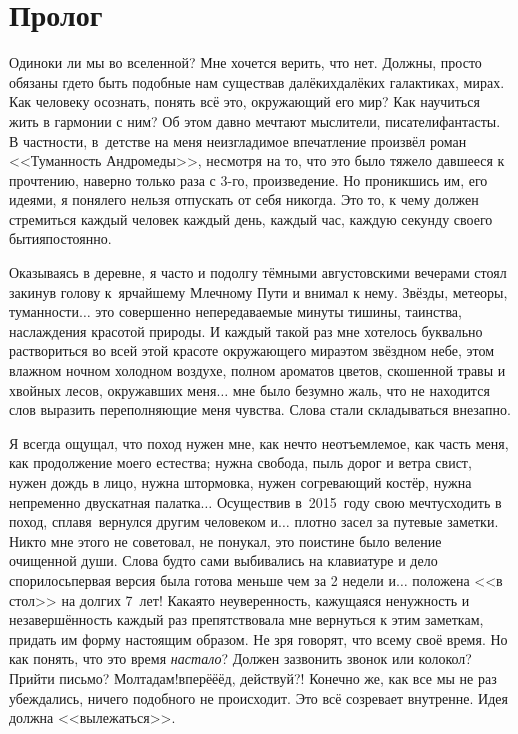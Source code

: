 \newpage
{
\thispagestyle{empty}
\section*{Пролог}

Одиноки ли мы во вселенной? Мне хочется верить, что нет. Должны, просто обязаны где\sdash то быть подобные нам существа\mdash в далёких\sdash далёких галактиках, мирах. Как человеку осознать, понять всё это, окружающий его мир? Как научиться жить в гармонии с ним? Об этом давно мечтают мыслители, писатели\sdash фантасты. В частности, в~детстве на меня неизгладимое впечатление произвёл роман <<Туманность Андромеды>>\cite{ТуманностьАндромеды}, несмотря на то, что это было тяжело давшееся к прочтению, наверно только раза с 3-го, произведение. Но проникшись им, его идеями, я понял\mdash его нельзя отпускать от себя ни\sdash ко\sdash гда. Это то, к чему должен стремиться каждый человек каждый день, каждый час, каждую секунду своего бытия\mdash постоянно. 

Оказываясь в деревне, я часто и подолгу тёмными августовскими вечерами стоял закинув голову к~ярчайшему Млечному Пути и внимал к нему. Звёзды, метеоры, туманности$\ldots$ это совершенно непередаваемые минуты тишины, таинства, наслаждения красотой природы. И каждый такой раз мне хотелось буквально раствориться во всей этой красоте окружающего мира\mdash этом звёздном небе, этом влажном ночном холодном воздухе, полном ароматов цветов, скошенной травы и хвойных лесов, окружавших меня$\ldots$ мне было безумно жаль, что не находится слов выразить переполняющие меня чувства. Слова стали складываться внезапно. 

Я всегда ощущал, что поход нужен мне, как нечто неотъемлемое, как часть меня, как продолжение моего естества; нужна свобода, пыль дорог и ветра свист, нужен дождь в лицо, нужна штормовка, нужен согревающий костёр, нужна непременно двускатная палатка$\ldots$ Осуществив в~2015~году свою мечту\mdash сходить в поход, сплав\mdash я~вернулся другим человеком и$\ldots$ плотно засел за путевые заметки. Никто мне этого не советовал, не понукал, это поистине было веление очищенной души. Слова будто сами выбивались на клавиатуре и дело спорилось\mdash первая версия была готова меньше чем за 2 недели и$\ldots$ положена <<в стол>> на долгих 7~лет! Какая\sdash то неуверенность, кажущаяся ненужность и незавершённость каждый раз препятствовала мне вернуться к этим заметкам, придать им форму настоящим образом. Не зря говорят, что всему своё время. Но как понять, что это время \textit{настало}? Должен зазвонить звонок или колокол? Прийти письмо? Мол\mdash та\sdash дам!\mdash вперё\sdash ё\sdash ёд, действуй?! Конечно же, как все мы не раз убеждались, ничего подобного не происходит. Это всё созревает внутренне. Идея должна <<вылежаться>>.

}
